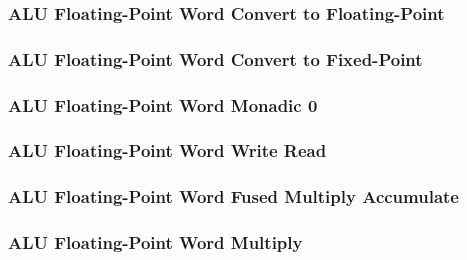 \subsubsection[{\small ALU Floating-Point Word Convert to Floating-Point}]{ALU Floating-Point Word Convert to Floating-Point} \label{sec:format-ALU-FWFLOAT}



\subsubsection[{\small ALU Floating-Point Word Convert to Fixed-Point}]{ALU Floating-Point Word Convert to Fixed-Point} \label{sec:format-ALU-FWFIXED}



\subsubsection[{\small ALU Floating-Point Word Monadic 0}]{ALU Floating-Point Word Monadic 0} \label{sec:format-ALU-FWMO0}



\subsubsection[{\small ALU Floating-Point Word Write Read}]{ALU Floating-Point Word Write Read} \label{sec:format-ALU-FWWR}



\subsubsection[{\small ALU Floating-Point Word Fused Multiply Accumulate}]{ALU Floating-Point Word Fused Multiply Accumulate} \label{sec:format-ALU-FWFMA}



\subsubsection[{\small ALU Floating-Point Word Multiply}]{ALU Floating-Point Word Multiply} \label{sec:format-ALU-FWMUL}

